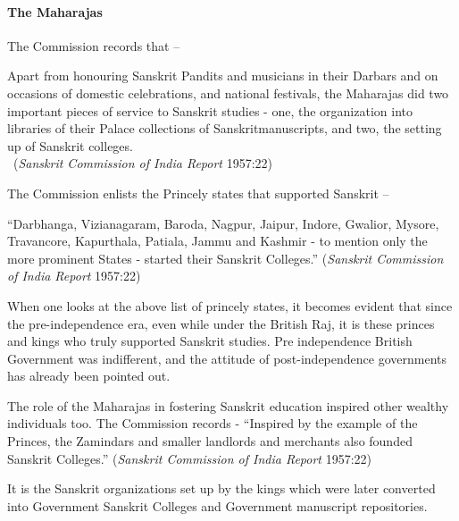 \paragraph{The Maharajas}

The Commission records that –
\begin{myquote}
\eleven
Apart from honouring Sanskrit Pandits and musicians in their Darbars and on occasions of domestic celebrations, and national festivals, the Maharajas did two important pieces of service to Sanskrit studies - one, the organization into libraries of their Palace collections of Sanskrit\break manuscripts, and two, the setting up of Sanskrit colleges.\\[-15pt]

~\hfill({\sl Sanskrit Commission of India Report} 1957:22)
\end{myquote}

The Commission enlists the Princely states that supported Sanskrit –
\begin{myquote}
\eleven
“Darbhanga, Vizianagaram, Baroda, Nagpur, Jaipur, Indore, Gwalior, Mysore, Travancore, Kapurthala, Patiala, Jammu and Kashmir - to mention only the more prominent States - started their Sanskrit Colleges.” \hfill({\sl Sanskrit Commission of India Report} 1957:22)
\end{myquote}

When one looks at the above list of princely states, it becomes evident that since the pre-independence era, even while under the British Raj, it is these princes and kings who truly supported Sanskrit studies. Pre independence British Government was indifferent, and the attitude of post-independence governments has already been pointed out. 

The role of the Maharajas in fostering Sanskrit education inspired other wealthy individuals too. The Commission records - “Inspired by the example of the Princes, the Zamindars and smaller landlords and merchants also founded Sanskrit Colleges.” ({\sl Sanskrit Commission of India Report} 1957:22)

It is the Sanskrit organizations set up by the kings which were later converted into Government Sanskrit Colleges and Government manuscript repositories.    

